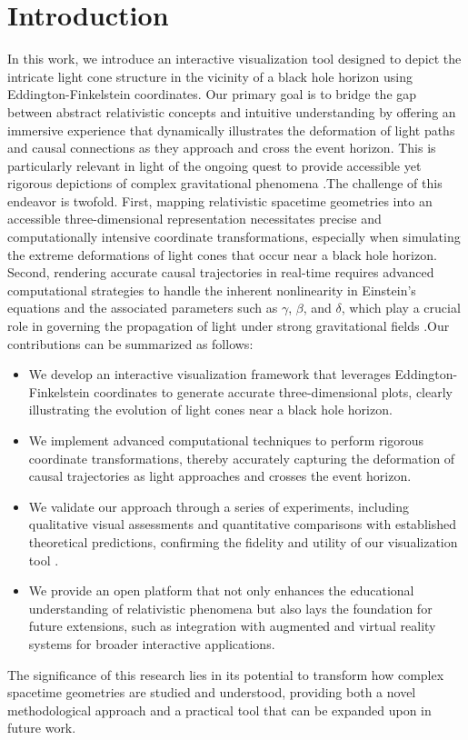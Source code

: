 \documentclass{article}
\begin{document}
\section{Introduction}
In this work, we introduce an interactive visualization tool designed to depict the intricate light cone structure in the vicinity of a black hole horizon using Eddington-Finkelstein coordinates. Our primary goal is to bridge the gap between abstract relativistic concepts and intuitive understanding by offering an immersive experience that dynamically illustrates the deformation of light paths and causal connections as they approach and cross the event horizon. This is particularly relevant in light of the ongoing quest to provide accessible yet rigorous depictions of complex gravitational phenomena \cite{Reference1 Reference2}.The challenge of this endeavor is twofold. First, mapping relativistic spacetime geometries into an accessible three-dimensional representation necessitates precise and computationally intensive coordinate transformations, especially when simulating the extreme deformations of light cones that occur near a black hole horizon. Second, rendering accurate causal trajectories in real-time requires advanced computational strategies to handle the inherent nonlinearity in Einstein's equations and the associated parameters such as $\gamma$, $\beta$, and $\delta$, which play a crucial role in governing the propagation of light under strong gravitational fields \cite{Reference3}.Our contributions can be summarized as follows:\begin{itemize}  \item We develop an interactive visualization framework that leverages Eddington-Finkelstein coordinates to generate accurate three-dimensional plots, clearly illustrating the evolution of light cones near a black hole horizon.  \item We implement advanced computational techniques to perform rigorous coordinate transformations, thereby accurately capturing the deformation of causal trajectories as light approaches and crosses the event horizon.  \item We validate our approach through a series of experiments, including qualitative visual assessments and quantitative comparisons with established theoretical predictions, confirming the fidelity and utility of our visualization tool \cite{Reference4}.  \item We provide an open platform that not only enhances the educational understanding of relativistic phenomena but also lays the foundation for future extensions, such as integration with augmented and virtual reality systems for broader interactive applications.\end{itemize}The significance of this research lies in its potential to transform how complex spacetime geometries are studied and understood, providing both a novel methodological approach and a practical tool that can be expanded upon in future work.
\end{document}
